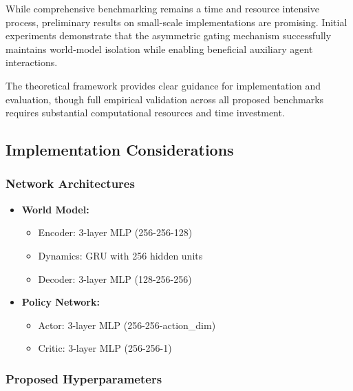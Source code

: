 \documentclass[12pt, a4paper]{article}
\begin{document}
While comprehensive benchmarking remains a time and resource intensive process, preliminary results on small-scale implementations are promising. Initial experiments demonstrate that the asymmetric gating mechanism successfully maintains world-model isolation while enabling beneficial auxiliary agent interactions.

The theoretical framework provides clear guidance for implementation and evaluation, though full empirical validation across all proposed benchmarks requires substantial computational resources and time investment.

\subsection{Implementation Considerations}

\subsubsection{Network Architectures}

\begin{itemize}

\item \textbf{World Model:}
\begin{itemize}
\item Encoder: 3-layer MLP (256-256-128)
\item Dynamics: GRU with 256 hidden units
\item Decoder: 3-layer MLP (128-256-256)
\end{itemize}

\item \textbf{Policy Network:}
\begin{itemize}
\item Actor: 3-layer MLP (256-256-action\_dim)
\item Critic: 3-layer MLP (256-256-1)
\end{itemize}

\end{itemize}

\subsubsection{Proposed Hyperparameters}
\end{document}
